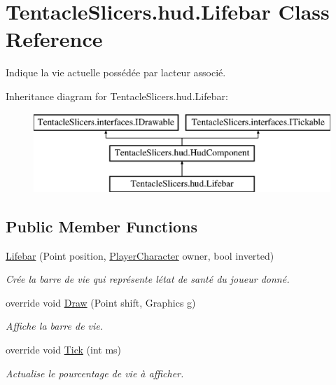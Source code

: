 \hypertarget{class_tentacle_slicers_1_1hud_1_1_lifebar}{}\section{Tentacle\+Slicers.\+hud.\+Lifebar Class Reference}
\label{class_tentacle_slicers_1_1hud_1_1_lifebar}


Indique la vie actuelle possédée par l\textquotesingle{}acteur associé.  


Inheritance diagram for Tentacle\+Slicers.\+hud.\+Lifebar\+:\begin{figure}[H]
\begin{center}
\leavevmode
\includegraphics[height=3.000000cm]{class_tentacle_slicers_1_1hud_1_1_lifebar}
\end{center}
\end{figure}
\subsection*{Public Member Functions}
\begin{DoxyCompactItemize}
\item 
\hyperlink{class_tentacle_slicers_1_1hud_1_1_lifebar_a3dcac14f3effb59f113af80ade641141}{Lifebar} (Point position, \hyperlink{class_tentacle_slicers_1_1actors_1_1_player_character}{Player\+Character} owner, bool inverted)
\begin{DoxyCompactList}\small\item\em Crée la barre de vie qui représente l\textquotesingle{}état de santé du joueur donné. \end{DoxyCompactList}\item 
override void \hyperlink{class_tentacle_slicers_1_1hud_1_1_lifebar_aed0dfe55660f68f90a8dd9ff98af0dfa}{Draw} (Point shift, Graphics g)
\begin{DoxyCompactList}\small\item\em Affiche la barre de vie. \end{DoxyCompactList}\item 
override void \hyperlink{class_tentacle_slicers_1_1hud_1_1_lifebar_a7c048aa89453e97f85c9b0dbdb3fe86e}{Tick} (int ms)
\begin{DoxyCompactList}\small\item\em Actualise le pourcentage de vie à afficher. \end{DoxyCompactList}\end{DoxyCompactItemize}
